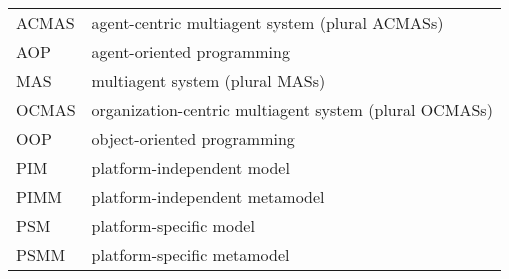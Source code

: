 

\begin{tabular}{ l l }
	ACMAS & agent-centric multiagent system (plural ACMASs)\\
	AOP & agent-oriented programming\\
	MAS & multiagent system (plural MASs)\\
	OCMAS & organization-centric multiagent system (plural OCMASs)\\
	OOP & object-oriented programming\\
	PIM & platform-independent model\\
	PIMM & platform-independent metamodel\\
	PSM & platform-specific model\\
	PSMM & platform-specific metamodel
\end{tabular}